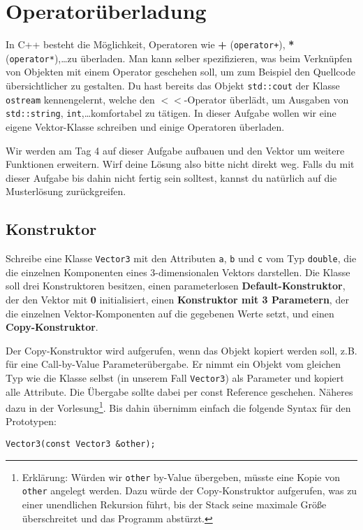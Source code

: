 \newpage
\section{Operatorüberladung}
In C++ besteht die Möglichkeit, Operatoren wie \textbf{+} (\texttt{operator+}), \textbf{*} (\texttt{operator*}),\dots zu überladen.
Man kann selber spezifizieren, was beim Verknüpfen von Objekten mit einem Operator geschehen soll, um zum Beispiel den Quellcode übersichtlicher zu gestalten.
Du hast bereits das Objekt \texttt{std::cout} der Klasse \texttt{ostream} kennengelernt, welche den $<<$-Operator überlädt, um Ausgaben von \texttt{std::string}, \texttt{int},\dots komfortabel zu tätigen.
In dieser Aufgabe wollen wir eine eigene Vektor-Klasse schreiben und einige Operatoren überladen.

Wir werden am Tag 4 auf dieser Aufgabe aufbauen und den Vektor um weitere Funktionen erweitern.
Wirf deine Lösung also bitte nicht direkt weg.
Falls du mit dieser Aufgabe bis dahin nicht fertig sein solltest, kannst du natürlich auf die Musterlösung zurückgreifen.

\subsection{Konstruktor}
Schreibe eine Klasse \texttt{Vector3} mit den Attributen \texttt{a}, \texttt{b} und \texttt{c} vom Typ \texttt{double}, die die einzelnen Komponenten eines 3-dimensionalen Vektors darstellen.
Die Klasse soll drei Konstruktoren besitzen, einen parameterlosen \textbf{Default-Konstruktor}, der den Vektor mit \textbf{0} initialisiert, einen \textbf{Konstruktor mit 3 Parametern}, der die einzelnen Vektor-Komponenten auf die gegebenen Werte setzt, und einen \textbf{Copy-Konstruktor}.

Der Copy-Konstruktor wird aufgerufen, wenn das Objekt kopiert werden soll, z.B. für eine Call-by-Value Parameterübergabe.
Er nimmt ein Objekt vom gleichen Typ wie die Klasse selbst (in unserem Fall \texttt{Vector3}) als Parameter und kopiert alle Attribute.
Die Übergabe sollte dabei per const Reference geschehen.
Näheres dazu in der Vorlesung\footnote{Erklärung: Würden wir \texttt{other} by-Value übergeben, müsste eine Kopie von \texttt{other} angelegt werden.
Dazu würde der Copy-Konstruktor aufgerufen, was zu einer unendlichen Rekursion führt, bis der Stack seine maximale Größe überschreitet und das Programm abstürzt.}.
Bis dahin übernimm einfach die folgende Syntax für den Prototypen:
\begin{lstlisting}
Vector3(const Vector3 &other);
\end{lstlisting}

